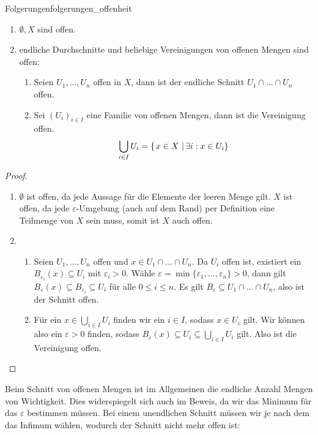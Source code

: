 \begin{lemma}{Folgerungen}{folgerungen_offenheit}
\begin{enumerate}
    \item $\emptyset, X$ sind offen.
    \item endliche Durchschnitte und beliebige Vereinigungen von offenen Mengen sind offen:
    \begin{enumerate}[label=(\alph*)]
        \item Seien $U_1, ... , U_n$ offen in $X$, dann ist der endliche Schnitt $U_1 \cap ... \cap U_n $ offen.
        \item Sei $(U_i)_{i \in I}$ eine Familie von offenen Mengen, dann ist die Vereinigung offen.
        $$\bigcup_{i\in I}U_i = \left\{\left.x \in X \ \right| \exists i:x \in U_i \right\}$$ 
    \end{enumerate}
\end{enumerate}
\end{lemma}
\begin{proof}
\begin{enumerate}
    \item $\emptyset$ ist offen, da jede Aussage für die Elemente der leeren Menge gilt. $X$ ist offen, da jede $\varepsilon$-Umgebung (auch auf dem Rand) per Definition eine Teilmenge von $X$ sein muss, somit ist $X$ auch offen.
    \item \begin{enumerate}[label=(\alph*)]
        \item Seien $U_1, ... , U_n$ offen und $x \in U_1 \cap ... \cap U_n $. Da $U_i$ offen ist, existiert ein $B_{\varepsilon_i}(x) \subseteq U_i$ mit $\varepsilon_i > 0$. Wähle $\varepsilon = \min\{\varepsilon_1, ..., \varepsilon_n\} > 0$, dann gilt $B_\varepsilon(x) \subseteq B_{\varepsilon_i} \subseteq U_i$ für alle $0 \leq i \leq n$. Es gilt $B_\varepsilon \subseteq U_1 \cap ... \cap U_n$, also ist der Schnitt offen.
        \item Für ein $x \in \bigcup_{i\in I}U_i$ finden wir ein $i \in I$, sodass $x \in U_i$ gilt. Wir können also ein $\varepsilon >0$ finden, sodass $B_\varepsilon(x) \subseteq U_i \subseteq \bigcup_{i\in I}U_i$ gilt. Also ist die Vereinigung offen.
    \end{enumerate}
\end{enumerate}
\end{proof}

\begin{remark}
Beim Schnitt von offenen Mengen ist im Allgemeinen die endliche Anzahl Mengen von Wichtigkeit. Dies widerspiegelt sich auch im Beweis, da wir das Minimum für das $\varepsilon$ bestimmen müssen. Bei einem unendlichen Schnitt müssen wir je nach dem das Infimum wählen, wodurch der Schnitt nicht mehr offen ist:
\end{remark}

